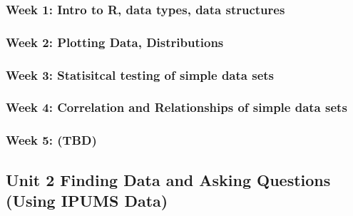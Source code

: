 \documentclass[
]{book}
\begin{document}
\hypertarget{week-1-intro-to-r-data-types-data-structures}{%
\subsubsection*{Week 1: Intro to R, data types, data structures}\label{week-1-intro-to-r-data-types-data-structures}}

\hypertarget{week-2-plotting-data-distributions}{%
\subsubsection*{Week 2: Plotting Data, Distributions}\label{week-2-plotting-data-distributions}}

\hypertarget{week-3-statisitcal-testing-of-simple-data-sets}{%
\subsubsection*{Week 3: Statisitcal testing of simple data sets}\label{week-3-statisitcal-testing-of-simple-data-sets}}

\hypertarget{week-4-correlation-and-relationships-of-simple-data-sets}{%
\subsubsection*{Week 4: Correlation and Relationships of simple data sets}\label{week-4-correlation-and-relationships-of-simple-data-sets}}

\hypertarget{week-5-tbd}{%
\subsubsection*{Week 5: (TBD)}\label{week-5-tbd}}

\hypertarget{unit-2-finding-data-and-asking-questions-using-ipums-data}{%
\subsection*{Unit 2 Finding Data and Asking Questions (Using IPUMS Data)}\label{unit-2-finding-data-and-asking-questions-using-ipums-data}}
\end{document}
